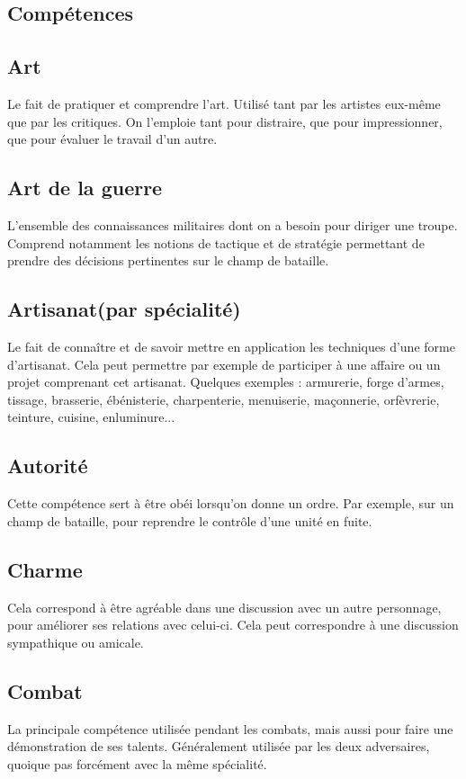 \documentclass[10pt,a4paper]{book}
\begin{document}
\begin{multicols}{2}
\section{Compétences}
\subsection*{Art} Le fait de pratiquer et comprendre l'art. Utilisé tant par les artistes eux-même que par les critiques. On l'emploie tant pour distraire, que pour impressionner, que pour évaluer le travail d'un autre.
\subsection*{Art de la guerre} L'ensemble des connaissances militaires dont on a besoin pour diriger une troupe. Comprend notamment les notions de tactique et de stratégie permettant de prendre des décisions pertinentes sur le champ de bataille.
\subsection*{Artisanat(par spécialité)} Le fait de connaître et de savoir mettre en application les techniques d'une forme d'artisanat. Cela peut permettre par exemple de participer à une affaire ou un projet comprenant cet artisanat. Quelques exemples : armurerie, forge d'armes, tissage, brasserie, ébénisterie, charpenterie, menuiserie, maçonnerie, orfèvrerie, teinture, cuisine, enluminure...
\subsection*{Autorité} Cette compétence sert à être obéi lorsqu'on donne un ordre. Par exemple, sur un champ de bataille, pour reprendre le contrôle d'une unité en fuite.
\subsection*{Charme}Cela correspond à être agréable dans une discussion avec un autre personnage, pour améliorer ses relations avec celui-ci. Cela peut correspondre à une discussion sympathique ou amicale.
\subsection*{Combat} La principale compétence utilisée pendant les combats, mais aussi pour faire une démonstration de ses talents. Généralement utilisée par les deux adversaires, quoique pas forcément avec la même spécialité.

\end{multicols}
\end{document}
